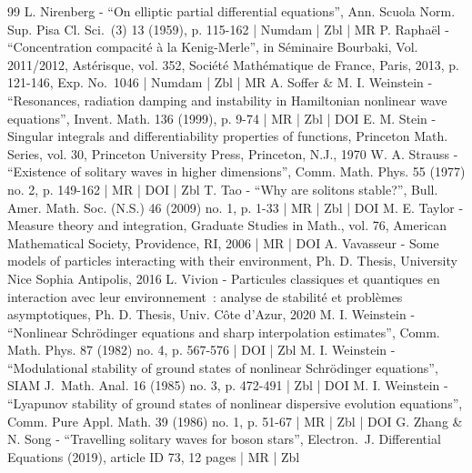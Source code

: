\documentclass[10pt]{amsart}
\theoremstyle{definition}
\begin{document}
\begin{thebibliography}{99}
L. Nirenberg - “On elliptic partial differential equations”, Ann. Scuola Norm. Sup. Pisa Cl. Sci. (3) 13 (1959), p. 115-162 | Numdam | Zbl | MR
P. Raphaël - “Concentration compacité à la Kenig-Merle”, in Séminaire Bourbaki, Vol. 2011/2012, Astérisque, vol. 352, Société Mathématique de France, Paris, 2013, p. 121-146, Exp. No. 1046 | Numdam | Zbl | MR
A. Soffer \& M. I. Weinstein - “Resonances, radiation damping and instability in Hamiltonian nonlinear wave equations”, Invent. Math. 136 (1999), p. 9-74 | MR | Zbl | DOI
E. M. Stein - Singular integrals and differentiability properties of functions, Princeton Math. Series, vol. 30, Princeton University Press, Princeton, N.J., 1970
W. A. Strauss - “Existence of solitary waves in higher dimensions”, Comm. Math. Phys. 55 (1977) no. 2, p. 149-162 | MR | DOI | Zbl
T. Tao - “Why are solitons stable?”, Bull. Amer. Math. Soc. (N.S.) 46 (2009) no. 1, p. 1-33 | MR | Zbl | DOI
M. E. Taylor - Measure theory and integration, Graduate Studies in Math., vol. 76, American Mathematical Society, Providence, RI, 2006 | MR | DOI
A. Vavasseur - Some models of particles interacting with their environment, Ph. D. Thesis, University Nice Sophia Antipolis, 2016
L. Vivion - Particules classiques et quantiques en interaction avec leur environnement : analyse de stabilité et problèmes asymptotiques, Ph. D. Thesis, Univ. Côte d’Azur, 2020
M. I. Weinstein - “Nonlinear Schrödinger equations and sharp interpolation estimates”, Comm. Math. Phys. 87 (1982) no. 4, p. 567-576 | DOI | Zbl
M. I. Weinstein - “Modulational stability of ground states of nonlinear Schrödinger equations”, SIAM J. Math. Anal. 16 (1985) no. 3, p. 472-491 | Zbl | DOI
M. I. Weinstein - “Lyapunov stability of ground states of nonlinear dispersive evolution equations”, Comm. Pure Appl. Math. 39 (1986) no. 1, p. 51-67 | MR | Zbl | DOI
G. Zhang \& N. Song - “Travelling solitary waves for boson stars”, Electron. J. Differential Equations (2019), article ID 73, 12 pages | MR | Zbl
\end{thebibliography}
\end{document}
